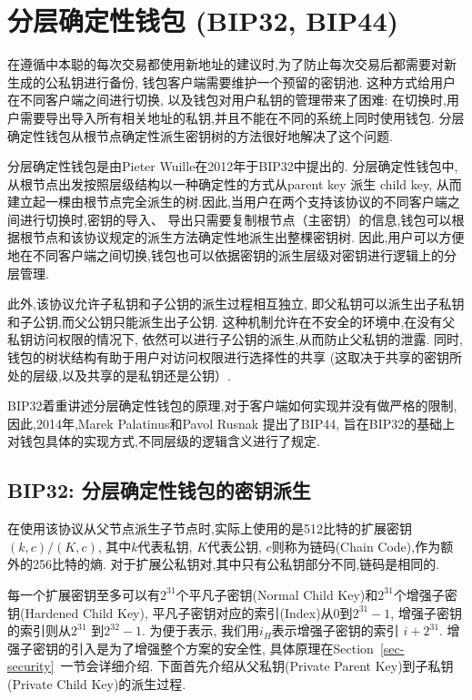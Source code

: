 \section{分层确定性钱包 (BIP32, BIP44)}

在遵循中本聪的每次交易都使用新地址的建议时,为了防止每次交易后都需要对新生成的公私钥进行备份,
钱包客户端需要维护一个预留的密钥池. 这种方式给用户在不同客户端之间进行切换, 以及钱包对用户私钥的管理带来了困难:
在切换时,用户需要导出导入所有相关地址的私钥,并且不能在不同的系统上同时使用钱包.
分层确定性钱包从根节点确定性派生密钥树的方法很好地解决了这个问题.

分层确定性钱包是由Pieter Wuille在2012年于BIP32中提出的.
分层确定性钱包中, 从根节点出发按照层级结构以一种确定性的方式从parent key 派生 child key,
从而建立起一棵由根节点完全派生的树.因此,当用户在两个支持该协议的不同客户端之间进行切换时,密钥的导入、
导出只需要复制根节点（主密钥）的信息,钱包可以根据根节点和该协议规定的派生方法确定性地派生出整棵密钥树.
因此,用户可以方便地在不同客户端之间切换,钱包也可以依据密钥的派生层级对密钥进行逻辑上的分层管理.
  
此外,该协议允许子私钥和子公钥的派生过程相互独立,
即父私钥可以派生出子私钥和子公钥,而父公钥只能派生出子公钥.
这种机制允许在不安全的环境中,在没有父私钥访问权限的情况下,
依然可以进行子公钥的派生,从而防止父私钥的泄露.
同时,钱包的树状结构有助于用户对访问权限进行选择性的共享
(这取决于共享的密钥所处的层级,以及共享的是私钥还是公钥）.  

BIP32着重讲述分层确定性钱包的原理,对于客户端如何实现并没有做严格的限制,
因此,2014年,Marek Palatinus和Pavol Rusnak 
提出了BIP44, 旨在BIP32的基础上对钱包具体的实现方式,不同层级的逻辑含义进行了规定.

\subsection{BIP32: 分层确定性钱包的密钥派生}

在使用该协议从父节点派生子节点时,实际上使用的是512比特的扩展密钥$(k,c)/(K,c)$,
其中$k$代表私钥, $K$代表公钥, $c$则称为链码(Chain Code),作为额外的256比特的熵.
对于扩展公私钥对,其中只有公私钥部分不同,链码是相同的.
 
每一个扩展密钥至多可以有$2^{31}$个平凡子密钥(Normal Child Key)和$2^{31}$个增强子密钥(Hardened Child Key), 
平凡子密钥对应的索引(Index)从0到$2^{31}-1$, 增强子密钥的索引则从$2^{31}$ 到$2^{32}-1$.
为便于表示, 我们用$i_H$表示增强子密钥的索引 $i+2^{31}$. 增强子密钥的引入是为了增强整个方案的安全性,
具体原理在Section~\ref{sec-security}~一节会详细介绍. 
下面首先介绍从父私钥(Private Parent Key)到子私钥(Private Child Key)的派生过程.

